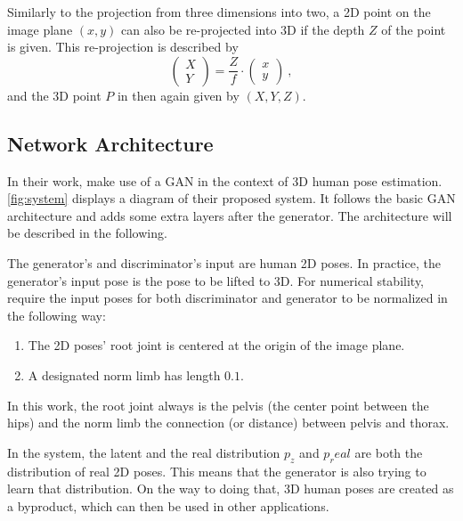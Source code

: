 Similarly to the projection from three dimensions into two, a 2D point on the image plane $(x, y)$ can also be re-projected into 3D if the depth $Z$ of the point is given.
This re-projection is described by
\begin{equation}
	\label{eq:perspective-re-projection}
	\begin{pmatrix}
	X\\
	Y
	\end{pmatrix} = \frac{Z}{f} \cdot
	\begin{pmatrix}
	x\\
	y
	\end{pmatrix} \ ,
\end{equation}
and the 3D point $P$ in then again given by $(X, Y, Z)$.

\subsection{Network Architecture}



In their work, \citet{drover18} make use of a GAN in the context of 3D human pose estimation.
\autoref{fig:system} displays a diagram of their proposed system.
It follows the basic GAN architecture and adds some extra layers after the generator.
The architecture will be described in the following.

The generator's and discriminator's input are human 2D poses.
In practice, the generator's input pose is the pose to be lifted to 3D.
For numerical stability, \citet{drover18} require the input poses for both discriminator and generator to be normalized in the following way:
\begin{enumerate}[label=(\Alph*)]
	\item The 2D poses' root joint is centered at the origin of the image plane.
	\item A designated norm limb has length $0.1$.
\end{enumerate}
In this work, the root joint always is the pelvis (the center point between the hips) and the norm limb the connection (or distance) between pelvis and thorax.

In the system, the latent and the real distribution $p_z$ and $p_real$ are both the distribution of real 2D poses.
This means that the generator is also trying to learn that distribution.
On the way to doing that, 3D human poses are created as a byproduct, which can then be used in other applications.

